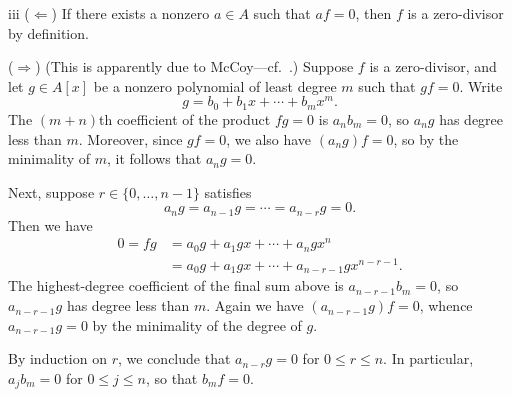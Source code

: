 \begin{partsolution}{1}{2}{iii}
(\(\Leftarrow\))
If there exists a nonzero \(a \in A\) such that \(a f = 0\), then \(f\) is a zero-divisor by definition.

(\(\Rightarrow\))
(This is apparently due to McCoy---cf.~\cite[Theorem 2]{McCoyDivisorsOfZero}.)
Suppose \(f\) is a zero-divisor, and let \(g \in A[x]\) be a nonzero polynomial of least degree \(m\) such that \(g f = 0\).
Write
\begin{equation*}
g = b_0 + b_1 x + \cdots + b_m x^m.
\end{equation*}
The \((m+n)\)th coefficient of the product \(f g = 0\) is \(a_n b_m = 0\), so \(a_n g\) has degree less than \(m\).
Moreover, since \(g f = 0\), we also have \((a_n g) f = 0\), so by the minimality of \(m\), it follows that \(a_n g = 0\).

Next, suppose \(r\in\{0,\ldots,n-1\}\) satisfies
\begin{equation*}
a_n g
= a_{n-1} g
= \cdots
= a_{n-r} g
= 0.
\end{equation*}
Then we have
\begin{align*}
0
= f g
&= a_0 g + a_1 g x + \cdots + a_n g x^n
\\&= a_0 g + a_1 g x + \cdots + a_{n-r-1} g x^{n-r-1}.
\end{align*}
The highest-degree coefficient of the final sum above is \(a_{n-r-1} b_m = 0\), so \(a_{n-r-1} g\) has degree less than \(m\).
Again we have \((a_{n-r-1} g) f = 0\), whence \(a_{n-r-1} g = 0\) by the minimality of the degree of \(g\).

By induction on \(r\), we conclude that \(a_{n-r} g = 0\) for \(0 \leq r \leq n\).
In particular, \(a_j b_m = 0\) for \(0\leq j \leq n\), so that \(b_m f = 0\).
\end{partsolution}